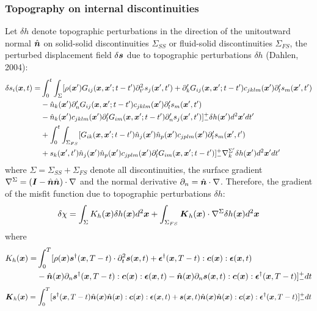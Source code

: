 \subsubsection{Topography on internal discontinuities}
Let $\delta h$ denote topographic perturbations in the direction
of the unitoutward normal $\hat{\boldsymbol{n}}$ on
solid-solid discontinuities $\Sigma_{SS}$ or fluid-solid discontinuities $\Sigma_{FS}$,
the perturbed displacement field $\delta\boldsymbol{s}$ due to topographic perturbations $\delta h$
(Dahlen, 2004):
\begin{align*}
  \delta s_i(\boldsymbol{x},t)= & \int_0^t\int_\Sigma[\rho(\boldsymbol{x}')G_{ij}(\boldsymbol{x},\boldsymbol{x}';t-t')\partial_{t'}^2s_j(\boldsymbol{x}',t')+\partial_k' G_{ij}(\boldsymbol{x},\boldsymbol{x}';t-t')c_{jklm}(\boldsymbol{x}')\partial_l' s_m(\boldsymbol{x}',t') \\
    & -\hat{n}_k(\boldsymbol{x}')\partial_n' G_{ij}(\boldsymbol{x},\boldsymbol{x}';t-t')c_{jklm}(\boldsymbol{x}')\partial_l' s_m(\boldsymbol{x}',t') \\
	& -\hat{n}_k(\boldsymbol{x}')c_{jklm}(\boldsymbol{x}')\partial_l' G_{im}(\boldsymbol{x},\boldsymbol{x}';t-t')\partial_n' s_j(\boldsymbol{x}',t')]_-^+\delta h(\boldsymbol{x}')d^2\boldsymbol{x}'dt' \\
	& +\int_0^t\int_{\Sigma_{FS}}[G_{ik}(\boldsymbol{x},\boldsymbol{x}';t-t')\hat{n}_j(\boldsymbol{x}')\hat{n}_p(\boldsymbol{x}')c_{jplm}(\boldsymbol{x}')\partial_l' s_m(\boldsymbol{x}',t') \\
	& +s_k(\boldsymbol{x}',t')\hat{n}_j(\boldsymbol{x}')\hat{n}_p(\boldsymbol{x}')c_{jplm}(\boldsymbol{x}')\partial_l' G_{im}(\boldsymbol{x},\boldsymbol{x}';t-t')]_-^+\nabla_k^{\Sigma'}\delta h(\boldsymbol{x}')d^2\boldsymbol{x}'dt'
\end{align*}
where $\Sigma=\Sigma_{SS}+\Sigma_{FS}$ denote all discontinuities,
the surface gradient $\nabla^\Sigma=(\boldsymbol{I}-\hat{\boldsymbol{n}}\hat{\boldsymbol{n}})\cdot\nabla$
and the normal derivative $\partial_n=\hat{\boldsymbol{n}}\cdot\nabla$.
Therefore, the gradient of the misfit function due to topographic perturbations $\delta h$:
\[ \delta\chi=\int_\Sigma K_h(\boldsymbol{x})\delta h(\boldsymbol{x})d^2\boldsymbol{x}+\int_{\Sigma_{FS}}\boldsymbol{K}_h(\boldsymbol{x})\cdot\nabla^\Sigma\delta h(\boldsymbol{x})d^2\boldsymbol{x} \]
where
\begin{align*}
  K_h(\boldsymbol{x})= & \int_0^T[\rho(\boldsymbol{x})\boldsymbol{s}^\dagger(\boldsymbol{x},T-t)\cdot\partial_t^2\boldsymbol{s}(\boldsymbol{x},t)+\boldsymbol{\epsilon}^\dagger(\boldsymbol{x},T-t):\boldsymbol{c}(\boldsymbol{x}):\boldsymbol{\epsilon}(\boldsymbol{x},t) \\
    & -\hat{\boldsymbol{n}}(\boldsymbol{x})\partial_n\boldsymbol{s}^\dagger(\boldsymbol{x},T-t):\boldsymbol{c}(\boldsymbol{x}):\boldsymbol{\epsilon}(\boldsymbol{x},t)-\hat{\boldsymbol{n}}(\boldsymbol{x})\partial_n\boldsymbol{s}(\boldsymbol{x},t):\boldsymbol{c}(\boldsymbol{x}):\boldsymbol{\epsilon}^\dagger(\boldsymbol{x},T-t)]_-^+dt
\end{align*}
\[ \boldsymbol{K}_h(\boldsymbol{x})=\int_0^T[\boldsymbol{s}^\dagger(\boldsymbol{x},T-t)\hat{\boldsymbol{n}}(\boldsymbol{x})\hat{\boldsymbol{n}}(\boldsymbol{x}):\boldsymbol{c}(\boldsymbol{x}):\boldsymbol{\epsilon}(\boldsymbol{x},t)+\boldsymbol{s}(\boldsymbol{x},t)\hat{\boldsymbol{n}}(\boldsymbol{x})\hat{\boldsymbol{n}}(\boldsymbol{x}):\boldsymbol{c}(\boldsymbol{x}):\boldsymbol{\epsilon}^\dagger(\boldsymbol{x},T-t)]_-^+dt \]

